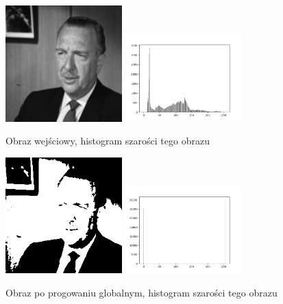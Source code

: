 \documentclass[final,a4paper,openany,12pt]{mwbk}
\begin{document}
\begin{figure}[H]
	\begin{center}
		\includegraphics[width=0.4\textwidth]{gentelman_gray}
		\includegraphics[width=0.4\textwidth]{gentelman_gray_histogram}
	\end{center}
	\caption{Obraz wejściowy, histogram szarości tego obrazu}
\end{figure}

\begin{figure}[H]
	\begin{center}
		\includegraphics[width=0.4\textwidth]{gentelman_gray_globThreshold_result}
		\includegraphics[width=0.4\textwidth]{gentelman_gray_globThreshold_histogram}
	\end{center}
	\caption{Obraz po progowaniu globalnym, histogram szarości tego obrazu}
\end{figure}
\end{document}
